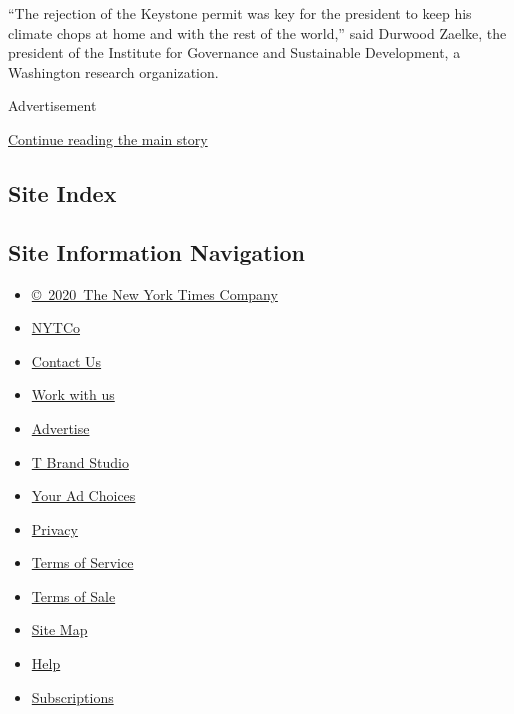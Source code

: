 ``The rejection of the Keystone permit was key for the president to keep
his climate chops at home and with the rest of the world,'' said Durwood
Zaelke, the president of the Institute for Governance and Sustainable
Development, a Washington research organization.

Advertisement

\protect\hyperlink{after-bottom}{Continue reading the main story}

\hypertarget{site-index}{%
\subsection{Site Index}\label{site-index}}

\hypertarget{site-information-navigation}{%
\subsection{Site Information
Navigation}\label{site-information-navigation}}

\begin{itemize}
\tightlist
\item
  \href{https://help.nytimes.com/hc/en-us/articles/115014792127-Copyright-notice}{©~2020~The
  New York Times Company}
\end{itemize}

\begin{itemize}
\tightlist
\item
  \href{https://www.nytco.com/}{NYTCo}
\item
  \href{https://help.nytimes.com/hc/en-us/articles/115015385887-Contact-Us}{Contact
  Us}
\item
  \href{https://www.nytco.com/careers/}{Work with us}
\item
  \href{https://nytmediakit.com/}{Advertise}
\item
  \href{http://www.tbrandstudio.com/}{T Brand Studio}
\item
  \href{https://www.nytimes.com/privacy/cookie-policy\#how-do-i-manage-trackers}{Your
  Ad Choices}
\item
  \href{https://www.nytimes.com/privacy}{Privacy}
\item
  \href{https://help.nytimes.com/hc/en-us/articles/115014893428-Terms-of-service}{Terms
  of Service}
\item
  \href{https://help.nytimes.com/hc/en-us/articles/115014893968-Terms-of-sale}{Terms
  of Sale}
\item
  \href{https://spiderbites.nytimes.com}{Site Map}
\item
  \href{https://help.nytimes.com/hc/en-us}{Help}
\item
  \href{https://www.nytimes.com/subscription?campaignId=37WXW}{Subscriptions}
\end{itemize}
